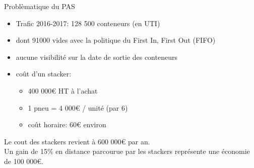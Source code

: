 \begin{frame}{Problèmatique du PAS}
      \begin{itemize}
      \item Trafic 2016-2017: 128 500 conteneurs (en UTI)
      \item dont 91000 vides avec la politique du First In, First Out (FIFO)
      \item aucune visibilité sur la date de sortie des conteneurs
      \item coût d'un stacker:
        \begin{itemize}
        \item 400 000\euro{}  HT à l'achat
        \item 1 pneu = 4 000\euro{} / unit\'e (par 6)
        \item coût horaire: 60\euro{}  environ
        \end{itemize}
      \end{itemize}
      \vfill
      Le cout des stackers revient à 600 000\euro{}  par an.\\
      Un gain de 15\% en distance parcourue par les stackers représente une économie de 100 000\euro.
\end{frame}

